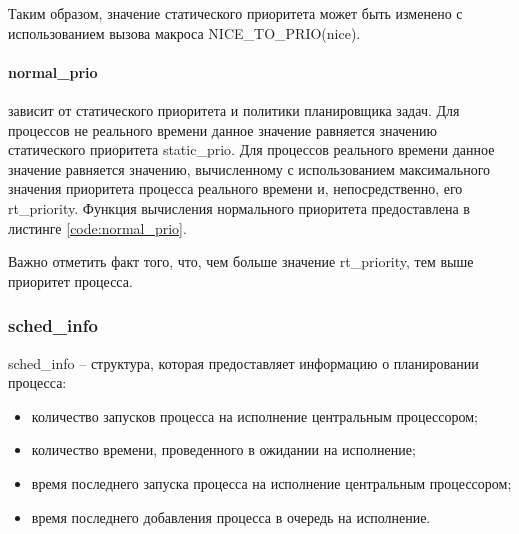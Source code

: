 
Таким образом, значение статического приоритета может быть изменено с использованием вызова макроса NICE\_TO\_PRIO(nice).

\paragraph*{normal\_prio} зависит от статического приоритета и политики планировщика задач. Для процессов не реального времени данное значение равняется значению статического приоритета static\_prio. Для процессов реального времени данное значение равняется значению, вычисленному с использованием максимального значения приоритета процесса реального времени и, непосредственно, его rt\_priority. Функция вычисления нормального приоритета предоставлена в листинге \ref{code:normal_prio}.


Важно отметить факт того, что, чем больше значение rt\_priority, тем выше приоритет процесса.

\subsubsection{sched\_info} 
sched\_info -- структура, которая предоставляет информацию о планировании процесса:
\begin{itemize}[leftmargin=1.6\parindent]
\item количество запусков процесса на исполнение центральным процессором;
\item количество времени, проведенного в ожидании на исполнение;
\item время последнего запуска процесса на исполнение центральным процессором;
\item время последнего добавления процесса в очередь на исполнение.
\end{itemize}

